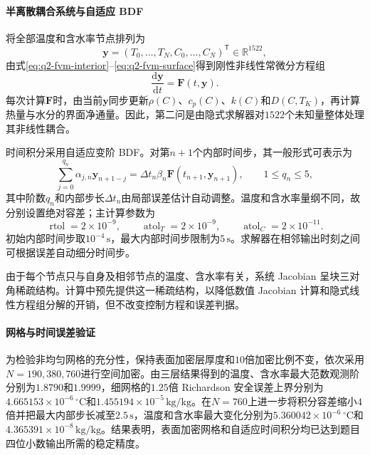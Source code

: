 \documentclass[withoutpreface,bwprint]{cumcmthesis}
\begin{document}
\paragraph{半离散耦合系统与自适应 BDF}
将全部温度和含水率节点排列为
\begin{equation}
\boldsymbol y
=
\left(
T_0,\ldots,T_N,
C_0,\ldots,C_N
\right)^{\mathsf T}
\in\mathbb R^{1522},
\label{eq:q2-state-vector}
\end{equation}
由式\eqref{eq:q2-fvm-interior}--\eqref{eq:q2-fvm-surface}得到刚性非线性常微分方程组
\begin{equation}
\frac{\mathrm d\boldsymbol y}{\mathrm dt}
=
\boldsymbol F(t,\boldsymbol y).
\label{eq:q2-semidiscrete-system}
\end{equation}
每次计算$\boldsymbol F$时，由当前$\boldsymbol y$同步更新$\rho(C)$、$c_p(C)$、$k(C)$和$D(C,T_K)$，再计算热量与水分的界面净通量。因此，第二问是由隐式求解器对$1522$个未知量整体处理其非线性耦合。

时间积分采用自适应变阶 BDF。对第$n+1$个内部时间步，其一般形式可表示为
\begin{equation}
\sum_{j=0}^{q_n}
\alpha_{j,n}\boldsymbol y_{n+1-j}
=
\Delta t_n\beta_n
\boldsymbol F(t_{n+1},\boldsymbol y_{n+1}),
\qquad
1\le q_n\le5,
\label{eq:q2-adaptive-bdf}
\end{equation}
其中阶数$q_n$和内部步长$\Delta t_n$由局部误差估计自动调整。温度和含水率量纲不同，故分别设置绝对容差；主计算参数为
\begin{equation}
\operatorname{rtol}=2\times10^{-9},
\qquad
\operatorname{atol}_T=2\times10^{-9},
\qquad
\operatorname{atol}_C=2\times10^{-11}.
\label{eq:q2-bdf-tolerances}
\end{equation}
初始内部时间步取$10^{-4}\,\mathrm{s}$，最大内部时间步限制为$5\,\mathrm{s}$。求解器在相邻输出时刻之间可根据误差自动细分时间步。

由于每个节点只与自身及相邻节点的温度、含水率有关，系统 Jacobian 呈块三对角稀疏结构。计算中预先提供这一稀疏结构，以降低数值 Jacobian 计算和隐式线性方程组分解的开销，但不改变控制方程和误差判据。

\paragraph{网格与时间误差验证}
为检验非均匀网格的充分性，保持表面加密层厚度和$10$倍加密比例不变，依次采用$N=190,380,760$进行空间加密。由三层结果得到的温度、含水率最大范数观测阶分别为$1.8790$和$1.9999$，细网格的$1.25$倍 Richardson 安全误差上界分别为$4.665153\times10^{-6}\,{}^\circ\mathrm C$和$1.455194\times10^{-5}\,\mathrm{kg/kg}$。在$N=760$上进一步将积分容差缩小$4$倍并把最大内部步长减至$2.5\,\mathrm{s}$，温度和含水率最大变化分别为$5.360042\times10^{-6}\,{}^\circ\mathrm C$和$4.365391\times10^{-8}\,\mathrm{kg/kg}$。结果表明，表面加密网格和自适应时间积分均已达到题目四位小数输出所需的稳定精度。
\end{document}
